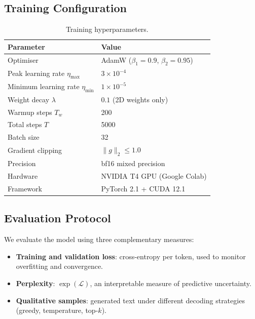 \subsection{Training Configuration}
\begin{table}[H]
\centering
\caption{Training hyperparameters.}
\label{tab:train}
\begin{tabular}{ll}
\toprule
\textbf{Parameter} & \textbf{Value} \\
\midrule
Optimiser                  & AdamW ($\beta_1 = 0.9$, $\beta_2 = 0.95$) \\
Peak learning rate $\eta_{\max}$ & $3 \times 10^{-4}$ \\
Minimum learning rate $\eta_{\min}$ & $1 \times 10^{-5}$ \\
Weight decay $\lambda$     & $0.1$ (2D weights only) \\
Warmup steps $T_w$         & 200 \\
Total steps $T$            & 5000 \\
Batch size                 & 32 \\
Gradient clipping          & $\|g\|_2 \leq 1.0$ \\
Precision                  & bf16 mixed precision \\
Hardware                   & NVIDIA T4 GPU (Google Colab) \\
Framework                  & PyTorch 2.1 + CUDA 12.1 \\
\bottomrule
\end{tabular}
\end{table}

\subsection{Evaluation Protocol}
We evaluate the model using three complementary measures:
\begin{itemize}
    \item \textbf{Training and validation loss}: cross-entropy per token, 
          used to monitor overfitting and convergence.
    \item \textbf{Perplexity}: $\exp(\mathcal{L})$, an interpretable 
          measure of predictive uncertainty.
    \item \textbf{Qualitative samples}: generated text under different 
          decoding strategies (greedy, temperature, top-$k$).
\end{itemize}